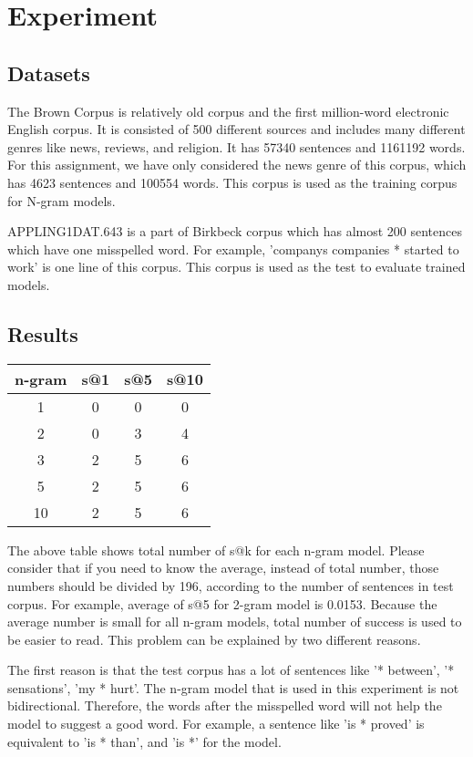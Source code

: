 \documentclass[sigconf]{acmart}
\begin{document}
\section{Experiment}
\subsection{Datasets}
The Brown Corpus is relatively old corpus and the first million-word electronic English corpus. It is consisted of 500 different sources and includes many different genres like news, reviews, and religion. It has 57340 sentences and 1161192 words. For this assignment, we have only considered the news genre of this corpus, which has 4623 sentences and 100554 words. This corpus is used as the training corpus for N-gram models.

APPLING1DAT.643 is a part of Birkbeck corpus which has almost 200 sentences which have one misspelled word. For example, 'companys  companies  * started to work' is one line of this corpus. This corpus is used as the test to evaluate trained models.
\subsection{Results}

\begin{center}
\begin{tabular}{ |c|c|c|c| } 
\hline
n-gram & s@1 & s@5 & s@10 \\
\hline
1 & 0 & 0 & 0 \\ 
2 & 0 & 3 & 4 \\
3 & 2 & 5 & 6 \\
5 & 2 & 5 & 6 \\
10 & 2 & 5 & 6 \\
\hline
\end{tabular}
\end{center}

The above table shows total number of s@k for each n-gram model. Please consider that if you need to know the average, instead of total number, those numbers should be divided by 196, according to the number of sentences in test corpus. For example, average of s@5 for 2-gram model is 0.0153. Because the average number is small for all n-gram models, total number of success is used to be easier to read. This problem can be explained by two different reasons. 

The first reason is that the test corpus has a lot of sentences like '* between', '* sensations', 'my * hurt'. The n-gram model that is used in this experiment is not bidirectional. Therefore, the words after the misspelled word will not help the model to suggest a good word. For example, a sentence like 'is * proved' is equivalent to 'is * than', and 'is *' for the model. 
\end{document}
